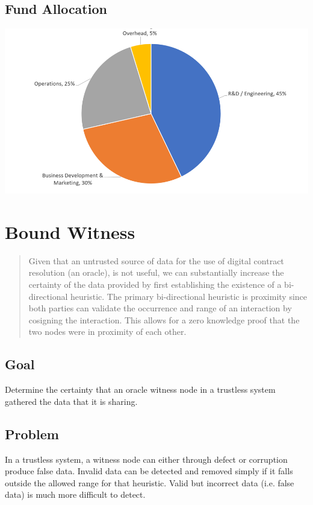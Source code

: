 \documentclass{article}
\begin{document}
\subsection {Fund Allocation}

\includegraphics[width=\textwidth] {fundallocation}

\clearpage
\section {Bound Witness}
\begin{abstract}
Given that an untrusted source of data for the use of digital contract resolution (an oracle), is not useful, we can substantially increase the certainty of the data provided by first establishing the existence of a bi-directional heuristic.  The primary bi-directional heuristic is proximity since both parties can validate the occurrence and range of an interaction by cosigning the interaction.  This allows for a zero knowledge proof that the two nodes were in proximity of each other.
\end{abstract}

\subsection {Goal}
Determine the certainty that an oracle witness node in a trustless system gathered the data that it is sharing.

\subsection {Problem}
In a trustless system, a witness node can either through defect or corruption produce false data.  Invalid data can be detected and removed simply if it falls outside the allowed range for that heuristic.  Valid but incorrect data (i.e. false data) is much more difficult to detect. 
\end{document}
